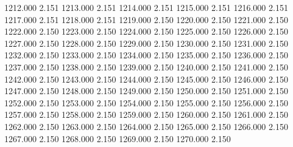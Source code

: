 1212.000 2.151 
1213.000 2.151 
1214.000 2.151 
1215.000 2.151 
1216.000 2.151 
1217.000 2.151 
1218.000 2.151 
1219.000 2.150 
1220.000 2.150 
1221.000 2.150 
1222.000 2.150 
1223.000 2.150 
1224.000 2.150 
1225.000 2.150 
1226.000 2.150 
1227.000 2.150 
1228.000 2.150 
1229.000 2.150 
1230.000 2.150 
1231.000 2.150 
1232.000 2.150 
1233.000 2.150 
1234.000 2.150 
1235.000 2.150 
1236.000 2.150 
1237.000 2.150 
1238.000 2.150 
1239.000 2.150 
1240.000 2.150 
1241.000 2.150 
1242.000 2.150 
1243.000 2.150 
1244.000 2.150 
1245.000 2.150 
1246.000 2.150 
1247.000 2.150 
1248.000 2.150 
1249.000 2.150 
1250.000 2.150 
1251.000 2.150 
1252.000 2.150 
1253.000 2.150 
1254.000 2.150 
1255.000 2.150 
1256.000 2.150 
1257.000 2.150 
1258.000 2.150 
1259.000 2.150 
1260.000 2.150 
1261.000 2.150 
1262.000 2.150 
1263.000 2.150 
1264.000 2.150 
1265.000 2.150 
1266.000 2.150 
1267.000 2.150 
1268.000 2.150 
1269.000 2.150 
1270.000 2.150 
